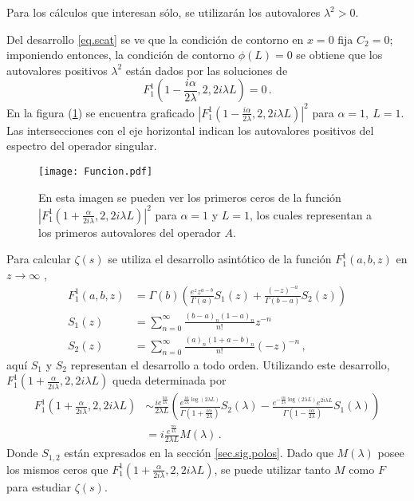 Para los cálculos que interesan sólo, se utilizarán los autovalores $\lambda ^2 >0$. 

Del desarrollo \eqref{eq.scat} se ve que la condición de contorno en $x=0$ fija $C _2 =0$;
imponiendo entonces, la condición de contorno $\phi (L)=0$ se obtiene que los autovalores positivos $\lambda ^2$ están dados por las soluciones de
\begin{equation}
F _1 ^1 \left(1-\frac{i \alpha}{2 \lambda},2,2 i \lambda L \right)  = 0
	\, .
\label{eq.1}
\end{equation}
En la figura (\ref{fig:funcion}) se encuentra graficado
\mbox{$ | F _1 ^1 (1-\frac{i \alpha}{2 \lambda},2,2 i \lambda L) | ^2 $} para $\alpha=1, \ L=1$. Las intersecciones con el eje horizontal indican los autovalores positivos del espectro del operador singular.


\begin{figure}[h!]
\centering
\texttt{[image: Funcion.pdf]}
\caption{En esta imagen se pueden ver los primeros ceros de la función $| F _1 ^1 (1+\frac{ \alpha}{2 i \lambda},2,2 i \lambda L) | ^2$ para $\alpha=1$ y $L=1$, los cuales representan a los primeros autovalores del operador $A$.}
\label{fig:funcion}
\end{figure}


Para calcular $\zeta(s)$ se utiliza el desarrollo asintótico de la función $F _1 ^1 (a,b,z)$ en $z \rightarrow \infty$ \cite{Abramowitz:hyper},
\begin{equation}
\begin{aligned}
    F _1 ^1 (a,b,z) &= \Gamma (b) 
    \left(
    \frac{e^z z ^{a-b} }{\Gamma(a)}  S_1 (z) + \frac{(-z) ^{ -a}}{ \Gamma(b-a)} 
    S_2 (z)
    \right) \\[5pt]
    S _1 (z) &= \sum _{n=0} ^{\infty} \frac{(b-a) _n (1-a) _n}{n!} z ^{-n} \\[5pt]
    S _2 (z) &= \sum _{n=0} ^{\infty} \frac{(a) _n (1+a-b) _n}{n!} (-z) ^{-n}     
		\, ,
\end{aligned}
\label{eq.aprox}
\end{equation}
aquí $S_1$ y $S _2$ representan el desarrollo a todo orden.
Utilizando este desarrollo, $F _1 ^1 \left(1+  \frac{  \alpha}{2 i \lambda} ,2 ,2 i \lambda L  \right)$ queda determinada por
\begin{align}
\label{eq.completa}
	F _1 ^1 \left(1+  \frac{  \alpha}{2 i \lambda} ,2 ,2 i \lambda L  \right) 
&	
	\sim
    \frac{i e ^{ \frac{\pi \alpha }{4 \lambda}  } }{2 \lambda L}
    \left(
    \frac{e ^{   \frac{ i \alpha}{2 \lambda}  \log (2 \lambda L) }}               {\Gamma(1+\frac{i \alpha}{2 \lambda})} S _2 ( \lambda )-
    \frac{e ^{-  \frac{i \alpha}{2 \lambda}  \log (2 \lambda L) } e ^{2 i \lambda L} }{\Gamma(1-\frac{i \alpha}{2 \lambda})} 
    S _1 ( \lambda )
    \right) 
\nonumber
\\[5pt]
&
    =  i  \frac{e ^{ \frac{\pi \alpha }{4 \lambda}  } }{2 \lambda L}     M (\lambda) 
    \, .
\end{align}
Donde $S _{1,2}$ están expresados en la sección \ref{sec.sig.polos}.
Dado que $M( \lambda)$ posee los mismos ceros que $F _1 ^1 \left(1+  \frac{  \alpha}{2 i \lambda} ,2 ,2 i \lambda L  \right)$, se puede utilizar tanto $M$ como $F$ para estudiar $\zeta (s)$.


